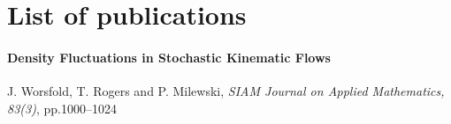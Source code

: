 \chapter*{List of publications}

\subsubsection*{Density Fluctuations in Stochastic Kinematic Flows}

J. Worsfold, T. Rogers and P. Milewski,
\textit{SIAM Journal on Applied Mathematics, 83(3)},
pp.1000–1024

\vfill